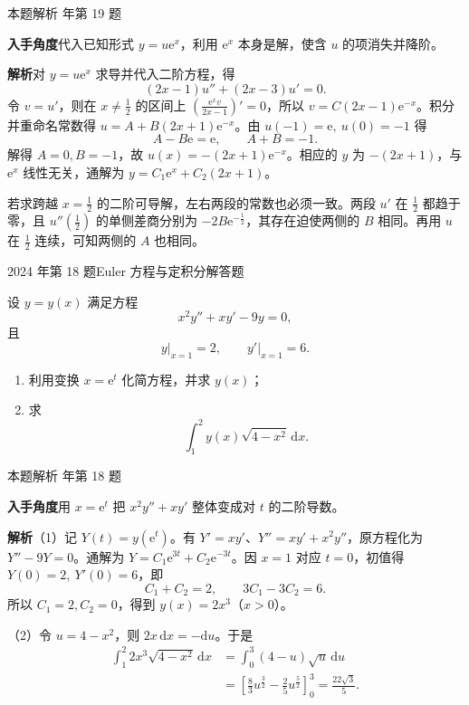 \documentclass[UTF8,zihao=-4,fontset=fandol]{ctexart}
\newcommand{\QuestionPage}[6]{%
  \par\noindent\begin{minipage}{\linewidth}
  \raggedright
  {\small\textcolor{black!60}{#3\quad #5}\hfill\textcolor{accent}{#2}}\par\smallskip}
\newcommand{\QuestionEnd}{\end{minipage}\par\medskip}
\newcommand{\QuestionPage}[6]{%
  \clearpage
  {\small\textcolor{accent}{#1\hfill #2}}\par\medskip
  {\small\textcolor{black!60}{#3\quad #5\hfill #6}}\par\vspace{9bp}}
\newcommand{\QuestionEnd}{}
\newenvironment{QuestionSolution}[1]{%
  \clearpage
  {\small\textcolor{black!60}{本题解析\quad #1}}\par\medskip
}{\par\clearpage}
\begin{document}
\begin{QuestionSolution}{2016 年第 19 题}
\textbf{入手角度}\quad 代入已知形式 \(y=u\mathrm{e}^x\)，利用 \(\mathrm{e}^x\) 本身是解，使含 \(u\) 的项消失并降阶。

\textbf{解析}\quad 对 \(y=u\mathrm{e}^x\) 求导并代入二阶方程，得
\[
(2x-1)u''+(2x-3)u'=0.
\]
令 \(v=u'\)，则在 \(x\ne\frac{1}{2}\) 的区间上 \((\frac{\mathrm{e}^xv}{2x-1})'=0\)，所以 \(v=C(2x-1)\mathrm{e}^{-x}\)。积分并重命名常数得 \(u=A+B(2x+1)\mathrm{e}^{-x}\)。由 \(u(-1)=\mathrm{e},\ u(0)=-1\) 得
\[
A-B\mathrm{e}=\mathrm{e},\qquad A+B=-1.
\]
解得 \(A=0,B=-1\)，故 \(\boxed{u(x)=-(2x+1)\mathrm{e}^{-x}}\)。相应的 \(y\) 为 \(-(2x+1)\)，与 \(\mathrm{e}^x\) 线性无关，通解为 \(\boxed{y=C_1\mathrm{e}^x+C_2(2x+1)}\)。

若求跨越 \(x=\frac{1}{2}\) 的二阶可导解，左右两段的常数也必须一致。两段 \(u'\) 在 \(\frac{1}{2}\) 都趋于零，且 \(u''(\frac{1}{2})\) 的单侧差商分别为 \(-2B\mathrm{e}^{-\frac{1}{2}}\)，其存在迫使两侧的 \(B\) 相同。再用 \(u\) 在 \(\frac{1}{2}\) 连续，可知两侧的 \(A\) 也相同。
\end{QuestionSolution}

\QuestionPage{4.2 高阶线性微分方程}{解答题}{2024 年第 18 题}{3}{Euler 方程与定积分}{234 / 234}
设 \(y=y(x)\) 满足方程
\[x^2y''+xy'-9y=0,
\]
且
\[y\big|_{x=1}=2,\qquad y'\big|_{x=1}=6.
\]
\begin{enumerate}
\item 利用变换 \(x=\mathrm{e}^t\) 化简方程，并求 \(y(x)\)；
\item 求
\[\int_1^2 y(x)\sqrt{4-x^2}\,\mathrm{d}x.
\]
\end{enumerate}
\QuestionEnd

\begin{QuestionSolution}{2024 年第 18 题}
\textbf{入手角度}\quad 用 \(x=\mathrm{e}^t\) 把 \(x^2y''+xy'\) 整体变成对 \(t\) 的二阶导数。

\textbf{解析}\quad （1）记 \(Y(t)=y(\mathrm{e}^t)\)。有 \(Y'=xy'\)、\(Y''=xy'+x^2y''\)，原方程化为 \(Y''-9Y=0\)。通解为 \(Y=C_1\mathrm{e}^{3t}+C_2\mathrm{e}^{-3t}\)。因 \(x=1\) 对应 \(t=0\)，初值得 \(Y(0)=2,\ Y'(0)=6\)，即
\[
C_1+C_2=2,\qquad 3C_1-3C_2=6.
\]
所以 \(C_1=2,C_2=0\)，得到 \(y(x)=\boxed{2x^3}\)（\(x>0\)）。

（2）令 \(u=4-x^2\)，则 \(2x\,\mathrm{d}x=-\mathrm{d}u\)。于是
\[
\begin{aligned}
\int_1^2 2x^3\sqrt{4-x^2}\,\mathrm{d}x
&=\int_0^3 (4-u)\sqrt{u}\,\mathrm{d}u\\
&=\left[\frac83u^{\frac{3}{2}}-\frac25u^{\frac{5}{2}}\right]_0^3
=\boxed{\frac{22\sqrt3}{5}}.
\end{aligned}
\]
\end{QuestionSolution}
\end{document}
